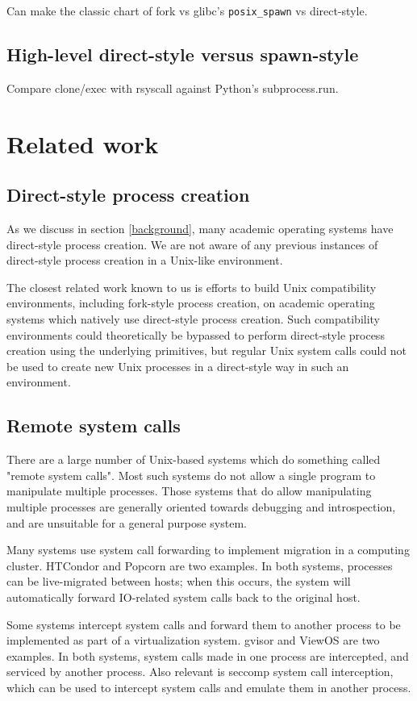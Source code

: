\documentclass[sigplan]{acmart}
\begin{document}
Can make the classic chart of fork vs glibc's \verb|posix_spawn| vs direct-style.
\subsection{High-level direct-style versus spawn-style}\label{subprocess_run}
Compare clone/exec with rsyscall against Python's subprocess.run.
\section{Related work}\label{related_work}
\subsection{Direct-style process creation}
As we discuss in section \ref{background},
many academic operating systems have direct-style process creation.
We are not aware of any previous instances of direct-style process creation in a Unix-like environment.

The closest related work known to us
is efforts to build Unix compatibility environments, including fork-style process creation,
on academic operating systems which natively use direct-style process creation.\cite{exokernel}
Such compatibility environments could theoretically be bypassed to perform direct-style process creation
using the underlying primitives,
but regular Unix system calls could not be used to create new Unix processes in a direct-style way
in such an environment.
\subsection{Remote system calls}
There are a large number of Unix-based systems which do something called "remote system calls".
Most such systems do not allow a single program to manipulate multiple processes.
Those systems that do allow manipulating multiple processes
are generally oriented towards debugging and introspection,
and are unsuitable for a general purpose system.

Many systems use system call forwarding to implement migration in a computing cluster.
HTCondor\cite{condor} and Popcorn\cite{popcorn} are two examples.
In both systems, processes can be live-migrated between hosts;
when this occurs, the system will automatically forward IO-related system calls
back to the original host.

Some systems intercept system calls and forward them to another process to be implemented
as part of a virtualization system.
gvisor\cite{gvisor} and ViewOS\cite{viewos} are two examples.
In both systems,
system calls made in one process are intercepted,
and serviced by another process.
Also relevant is seccomp system call interception,
which can be used to intercept system calls and emulate them in another process.
\end{document}
